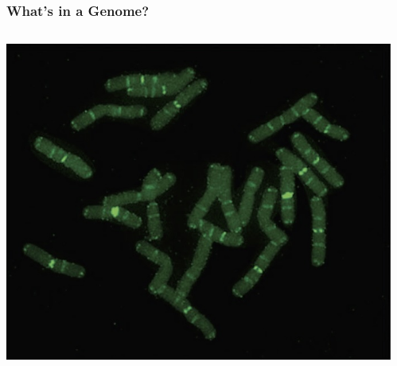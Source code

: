 \documentclass{beamer}
\begin{document}
\begin{frame}
	\frametitle{What's in a Genome?}
	
	
	\begin{columns}
		\begin{column}{0.33\textwidth}
			\centering	\includegraphics[keepaspectratio, width  = \textwidth]{img/loblollyChroms}\\ \pause
		\end{column}
		\begin{column}{0.33\textwidth}

\end{column}
\end{columns}
\end{frame}
\end{document}
